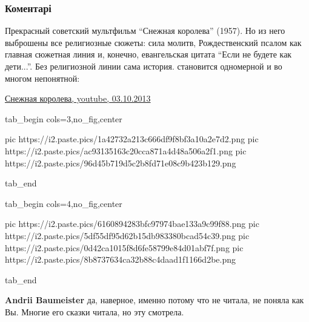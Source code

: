  
 
 
 
 
\subsubsection{Коментарі}
\label{sec:05_12_2021.fb.baumejster_andrej.kiev.filosof.1.skazka_andersen_snezhnaja_koroleva.cmt}

\begin{itemize} %

Прекрасный советский мультфильм \enquote{Снежная королева} (1957). Но из него выброшены
все религиозные сюжеты: сила молитв, Рождественский псалом как главная сюжетная
линия и, конечно, евангельская цитата \enquote{Если не будете как дети...}. Без
религиозной линии сама история. становится одномерной и во многом непонятной:

\href{https://youtu.be/1ajPJI5UyS0}{%
Снежная королева, youtube, 03.10.2013%
}

\ifcmt
  tab_begin cols=3,no_fig,center

     pic https://i2.paste.pics/1a42732a213c666df9f8bf3a10a2e7d2.png
		 pic https://i2.paste.pics/ac93135163c20cca871a4d48a506a2f1.png
		 pic https://i2.paste.pics/96d45b719d5c2b8fd71e08c9b423b129.png

  tab_end

  tab_begin cols=4,no_fig,center

		 pic https://i2.paste.pics/6160894283bfc97974bae133a9c99f88.png
		 pic https://i2.paste.pics/5df55df95d62b15db983380bcad54c39.png
		 pic https://i2.paste.pics/0d42ca1015f8d6fe58799e84d01abf7f.png
		 pic https://i2.paste.pics/8b8737634ca32b88c4daad1f1166d2be.png

  tab_end
\fi

\begin{itemize} %
\textbf{Andrii Baumeister} да, наверное, именно потому что не читала, не поняла как Вы. Многие его сказки читала, но эту смотрела.
\end{itemize} %




\end{itemize}
